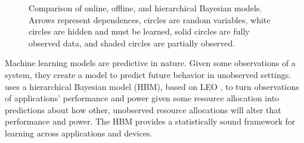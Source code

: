\begin{figure}

  \caption{ Comparison of online, offline, and hierarchical Bayesian
    models.  Arrows represent dependences, circles are random
    variables, white circles are hidden and must be learned, solid
    circles are fully observed data, and shaded circles are partially
    observed.}
\label{fig:learning-models}
\end{figure}

Machine learning models are predictive in nature.  Given some
observations of a system, they create a model to predict future
behavior in unobserved settings. \SYSTEM{} uses a hierarchical
Bayesian model (HBM), based on LEO \cite{LEO}, to turn observations of
applications' performance and power given some resource allocation
into predictions about how other, unobserved resource allocations will
alter that performance and power.  The HBM provides a statistically
sound framework for learning across applications and devices.

